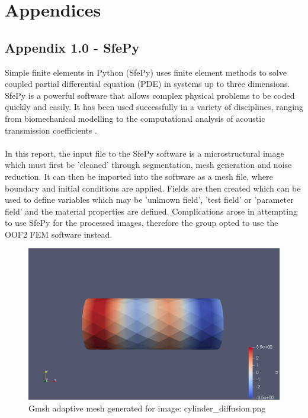 \documentclass[\report.tex]{subfiles}
\begin{document}
\section{Appendices}

\subsection{Appendix 1.0 - SfePy}
Simple finite elements in Python (SfePy) uses finite element methods to solve coupled partial differential equation (PDE) in systems up to three dimensions. SfePy is a powerful software that allows complex physical problems to be coded quickly and easily. It has been used successfully in a variety of disciplines, ranging from biomechanical modelling \cite{biomedapplication} to the computational analysis of acoustic transmission coefficients \cite{AcousticTransmission}.\\ \\In this report, the input file to the SfePy software is a microstructural image which must first be 'cleaned' through segmentation, mesh generation and noise reduction. It can then be imported into the software as a mesh file, where boundary and initial conditions are applied. Fields are then created which can be used to define variables which may be 'unknown field', 'test field' or 'parameter field' \cite{FEMinSfePy} and the material properties are defined. Complications arose in attempting to use SfePy for the processed images, therefore the group opted to use the OOF2 FEM software instead.

\begin{figure}[h!]
    \centering
    \includegraphics[width=14cm]{Images/cylinder_diffusion.png}
    \caption{Gmsh adaptive mesh generated for image: cylinder\_diffusion.png}
    \label{fig:sfepy_example}
\end{figure}
\end{document}
